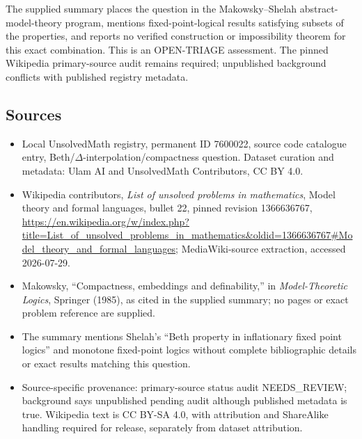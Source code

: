\documentclass[11pt]{article}
\begin{document}
The supplied summary places the question in the Makowsky--Shelah abstract-model-theory program, mentions fixed-point-logical results satisfying subsets of the properties, and reports no verified construction or impossibility theorem for this exact combination. This is an OPEN-TRIAGE assessment. The pinned Wikipedia primary-source audit remains required; unpublished background conflicts with published registry metadata.
\subsection{Sources}
\begin{itemize}
\item Local UnsolvedMath registry, permanent ID 7600022, source code catalogue entry, Beth/$\Delta$-interpolation/compactness question. Dataset curation and metadata: Ulam AI and UnsolvedMath Contributors, CC BY 4.0.
\item Wikipedia contributors, \emph{List of unsolved problems in mathematics}, Model theory and formal languages, bullet 22, pinned revision 1366636767, \url{https://en.wikipedia.org/w/index.php?title=List_of_unsolved_problems_in_mathematics&oldid=1366636767#Model_theory_and_formal_languages}; MediaWiki-source extraction, accessed 2026-07-29.
\item Makowsky, ``Compactness, embeddings and definability,'' in \emph{Model-Theoretic Logics}, Springer (1985), as cited in the supplied summary; no pages or exact problem reference are supplied.
\item The summary mentions Shelah's ``Beth property in inflationary fixed point logics'' and monotone fixed-point logics without complete bibliographic details or exact results matching this question.
\item Source-specific provenance: primary-source status audit NEEDS\_REVIEW; background says unpublished pending audit although published metadata is true. Wikipedia text is CC BY-SA 4.0, with attribution and ShareAlike handling required for release, separately from dataset attribution.
\end{itemize}
\end{document}
